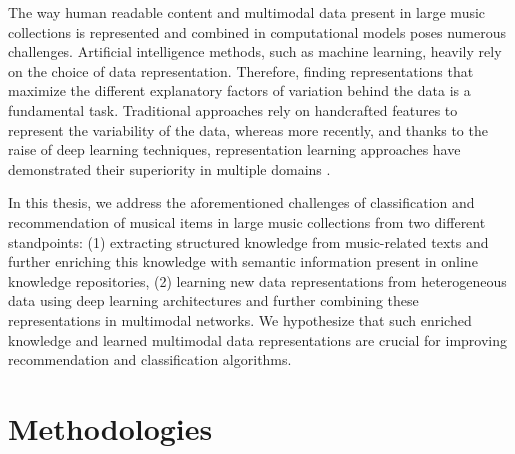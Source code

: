 
The way human readable content and multimodal data present in large music collections is represented and combined in computational models poses numerous challenges. Artificial intelligence methods, such as machine learning, heavily rely on the choice of data representation. Therefore, finding representations that maximize the different explanatory factors of variation behind the data is a fundamental task. Traditional approaches rely on handcrafted features to represent the variability of the data, whereas more recently, and thanks to the raise of deep learning techniques, representation learning approaches have demonstrated their superiority in multiple domains \citep{bengio2013representation}.

In this thesis, we address the aforementioned challenges of classification and recommendation of musical items in large music collections from two different standpoints: (1) extracting structured knowledge from music-related texts and further enriching this knowledge with semantic information present in online knowledge repositories, (2) learning new data representations from heterogeneous data using deep learning architectures and further combining these representations in multimodal networks. %
We hypothesize that such enriched knowledge and learned multimodal data representations are crucial for improving recommendation and classification algorithms. %

\section{Methodologies}

